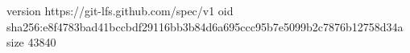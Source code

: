 version https://git-lfs.github.com/spec/v1
oid sha256:e8f4783bad41bccbdf29116bb3b84d6a695ccc95b7e5099b2c7876b12758d34a
size 43840
